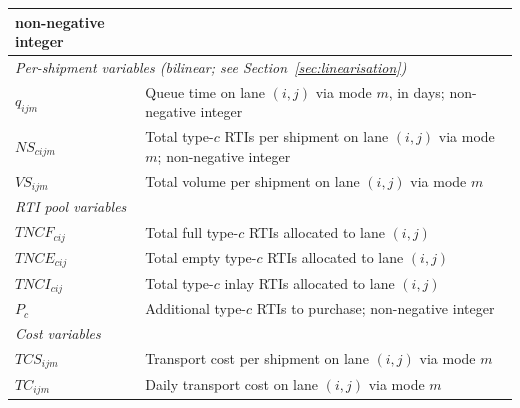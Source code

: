 \begin{longtable}{|p{}|p{}|}
    non-negative integer \\
\hline
\multicolumn{2}{|l|}{\textit{Per-shipment variables
    (\emph{bilinear}; see Section~\ref{sec:linearisation})}}\\ \hline
$q_{ijm}$
  & Queue time on lane $(i,j)$ via mode $m$, in days;
    non-negative integer \\
$NS_{cijm}$
  & Total type-$c$ RTIs per shipment on lane $(i,j)$ via mode $m$;
    non-negative integer \\
$VS_{ijm}$
  & Total volume per shipment on lane $(i,j)$ via mode $m$ \\
\hline
\multicolumn{2}{|l|}{\textit{RTI pool variables}}\\ \hline
$TNCF_{cij}$
  & Total full type-$c$ RTIs allocated to lane $(i,j)$ \\
$TNCE_{cij}$
  & Total empty type-$c$ RTIs allocated to lane $(i,j)$ \\
$TNCI_{cij}$
  & Total type-$c$ inlay RTIs allocated to lane $(i,j)$ \\
$P_{c}$
  & Additional type-$c$ RTIs to purchase; non-negative integer \\
\hline
\multicolumn{2}{|l|}{\textit{Cost variables}}\\ \hline
$TCS_{ijm}$
  & Transport cost per shipment on lane $(i,j)$ via mode $m$ \\
$TC_{ijm}$
  & Daily transport cost on lane $(i,j)$ via mode $m$ \\
\hline
\end{longtable}


